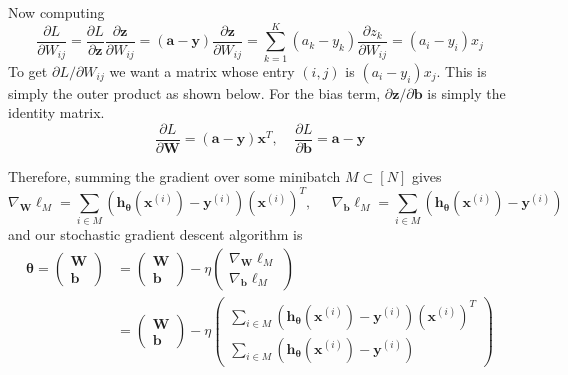 \documentclass{article}
\begin{document}
\begin{theorem}
      Now computing 
      \begin{equation}
        \frac{\partial L}{\partial W_{ij}} = \frac{\partial L}{\partial \mathbf{z}} \frac{\partial \mathbf{z}}{\partial W_{ij}} = (\mathbf{a} - \mathbf{y}) \frac{\partial \mathbf{z}}{\partial W_{ij}} = \sum_{k=1}^K (a_k - y_k) \frac{\partial z_k}{\partial W_{ij}} = (a_i - y_i) x_j
      \end{equation}
      To get $\partial L / \partial W_{ij}$ we want a matrix whose entry $(i, j)$ is $(a_i - y_i) x_j$. This is simply the outer product as shown below. For the bias term, $\partial \mathbf{z} / \partial \mathbf{b}$ is simply the identity matrix. 
      \begin{equation}
        \frac{\partial L}{\partial \mathbf{W}} = (\mathbf{a} - \mathbf{y}) \mathbf{x}^T, \;\;\;\; \frac{\partial L}{\partial \mathbf{b}} = \mathbf{a} - \mathbf{y}
      \end{equation}

      Therefore, summing the gradient over some minibatch $M \subset [N]$ gives 
      \begin{equation}
        \nabla_{\mathbf{W}} \ell_M = \sum_{i \in M} (\mathbf{h}_{\boldsymbol{\theta}}(\mathbf{x}^{(i)}) - \mathbf{y}^{(i)}) (\mathbf{x}^{(i)})^T, \;\;\;\;\; \nabla_{\mathbf{b}} \ell_M = \sum_{i \in M} (\mathbf{h}_{\boldsymbol{\theta}}(\mathbf{x}^{(i)}) - \mathbf{y}^{(i)})
      \end{equation}
      and our stochastic gradient descent algorithm is 
      \begin{align*}
        \boldsymbol{\theta} = \begin{pmatrix} \mathbf{W} \\ \mathbf{b} \end{pmatrix} & = \begin{pmatrix} \mathbf{W} \\ \mathbf{b} \end{pmatrix} - \eta \begin{pmatrix} \nabla_{\mathbf{W}} \ell_M \\ \nabla_{\mathbf{b}} \ell_M \end{pmatrix} \\
        & = \begin{pmatrix} \mathbf{W} \\ \mathbf{b} \end{pmatrix} - \eta \begin{pmatrix} \sum_{i \in M} (\mathbf{h}_{\boldsymbol{\theta}}(\mathbf{x}^{(i)}) - \mathbf{y}^{(i)}) (\mathbf{x}^{(i)})^T \\ \sum_{i \in M} (\mathbf{h}_{\boldsymbol{\theta}}(\mathbf{x}^{(i)}) - \mathbf{y}^{(i)}) \end{pmatrix} 
      \end{align*}
    \end{theorem}
\end{document}
